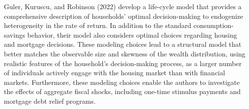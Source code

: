 \documentclass[\econtexRoot/Chp1]{subfiles}
\begin{document}
\par Guler, Kuruscu, and Robinson (2022) develop a life-cycle model that provides a comprehensive description of households' optimal decision-making to endogenize heterogeneity in the rate of return. In addition to the standard consumption-savings behavior, their model also considers optimal choices regarding housing and mortgage decisions. These modeling choices lead to a structural model that better matches the observable size and skewness of the wealth distribution, using realistic features of the household's decision-making process, as a larger number of individuals actively engage with the housing market than with financial markets. Furthermore, these modeling choices enable the authors to investigate the effects of aggregate fiscal shocks, including one-time stimulus payments and mortgage debt relief programs.


\onlyinsubfile{}

\end{document}

